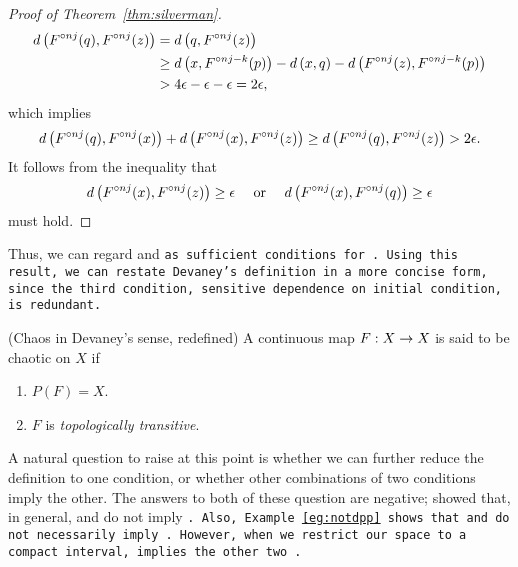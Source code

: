 \documentclass[12pt,draft,twoside]{book}
\begin{document}
\begin{proof}[Proof of Theorem~\ref{thm:silverman}]
\begin{align*}
    d\left( F^{\circ nj}(q), F^{\circ nj}(z) \right) 
    &= d\left( q, F^{\circ nj}(z) \right)  \\
    &\geq  d\left( x, F^{\circ nj-k}(p) \right) - d\left( x,q \right) - d\left( F^{\circ nj}(z), F^{\circ nj - k}(p) \right)  \\
    &> 4\epsilon - \epsilon - \epsilon 
    = 2\epsilon,
  \end{align*}
  which implies
  \begin{equation*}
    d\left( F^{\circ nj}(q), F^{\circ nj}(x) \right) + d\left( F^{\circ nj}(x), F^{\circ nj}(z) \right) 
    \geq d\left( F^{\circ nj}(q), F^{\circ nj}(z) \right)
    > 2\epsilon.
  \end{equation*}
  It follows from the inequality that 
  \begin{equation*}
    d\left( F^{\circ nj}(x), F^{\circ nj}(z) \right) \geq \epsilon \quad\mbox{ or }\quad d\left( F^{\circ nj}(x), F^{\circ nj}(q) \right) \geq \epsilon 
  \end{equation*}
  must hold.
\end{proof}

Thus, we can regard \dpp and \tt as sufficient conditions for \sdic.
Using this result, we can restate Devaney's definition in a more concise form, since the third condition, sensitive dependence on initial condition, is redundant.
\begin{definition}
  (Chaos in Devaney's sense, redefined) 
  A continuous map $F: X\rightarrow X$ is said to be chaotic on $X$ if
  \begin{enumerate}
    \item $P(F) = X$.
    \item $F$ is \textit{topologically transitive}.
  \end{enumerate}
\end{definition}
A natural question to raise at this point is whether we can further reduce the definition to one condition, or whether other combinations of two conditions imply the other.
The answers to both of these question are negative; \citet{assaf} showed that, in general, \dpp and \sdic do not imply \tt.
Also, Example~\ref{eg:notdpp} shows that \sdic and \tt do not necessarily imply \dpp.
However, when we restrict our space to a compact interval, \tt implies the other two \citep{silverman}.
\end{document}
